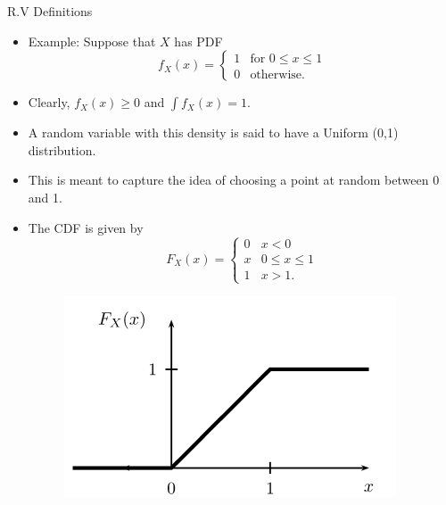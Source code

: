 \documentclass[handout]{beamer}
\begin{document}
\begin{frame}{R.V Definitions}
\scriptsize{
\begin{itemize}
 \item Example: Suppose that $X$ has PDF
 \[   
f_X(x) = 
     \begin{cases}
     1 & \text{for }0\leq x \leq 1 \\
     0 &  \text{otherwise.}
     \end{cases}
\]
 
\item Clearly, $f_X(x) \geq 0$ and $\int f_X(x) = 1$. 
\item A random variable with this density is said to have a Uniform (0,1) distribution.
\item This is meant to capture the idea of choosing a point at random between 0 and 1. 
\item The CDF is given by 
 \[   
F_X(x) = 
     \begin{cases}
     0 & x<0 \\
     x &  0\leq x \leq 1 \\
     1 &  x>1. 
     \end{cases}
\] 
 
\begin{figure}[h!]
	\centering
	\includegraphics[scale=0.4]{pics/cdf_uniform.png}
\end{figure} 
 
\end{itemize}




}
\end{frame}
\end{document}

